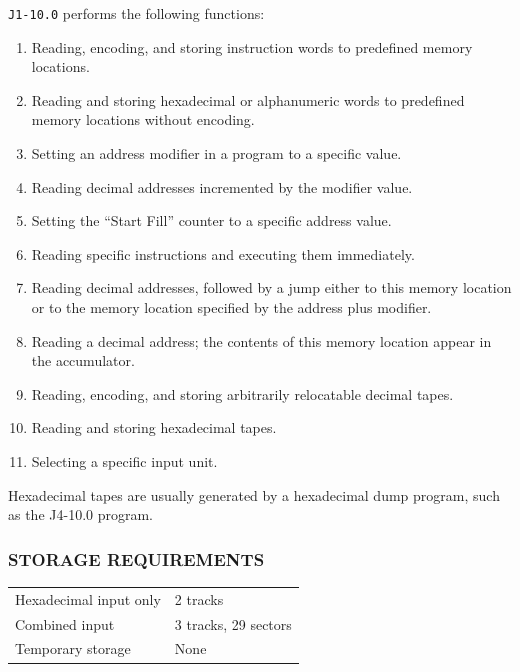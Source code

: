 \texttt{J1-10.0} performs the following functions:
\begin{enumerate}
\item Reading, encoding, and storing instruction words to predefined memory locations.
\item Reading and storing hexadecimal or alphanumeric words to predefined memory locations without encoding.
\item Setting an address modifier in a program to a specific value.
\item Reading decimal addresses incremented by the modifier value.
\item Setting the ``Start Fill'' counter to a specific address value.
\item Reading specific instructions and executing them immediately. 
\item Reading decimal addresses, followed by a jump either to this memory location or to the memory location specified by the address plus modifier.
\item Reading a decimal address; the contents of this memory location appear in the accumulator.
\item Reading, encoding, and storing arbitrarily relocatable decimal tapes.
\item Reading and storing hexadecimal tapes.
\item Selecting a specific input unit.
\end{enumerate}
Hexadecimal tapes are usually generated by a hexadecimal dump program, such as the J4-10.0 program.

\subsubsection*{STORAGE REQUIREMENTS}
\begin{center}
\begin{tabular}{ll}
    \toprule
    Hexadecimal input only & 2 tracks \\
    Combined input & 3 tracks, 29 sectors \\
    Temporary storage & None \\
    \bottomrule
\end{tabular}
\end{center}

